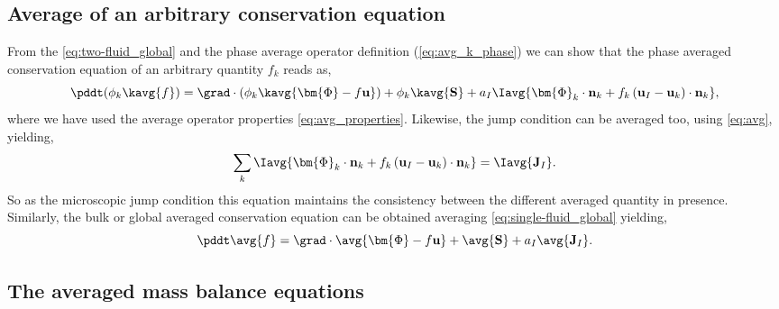 \subsection{Average of an arbitrary conservation equation}

From the \ref{eq:two-fluid_global} and the phase average operator definition (\ref{eq:avg_k_phase}) we can show that the phase averaged conservation equation of an arbitrary quantity $f_k$ reads as, 
\begin{equation}
    \pddt (\phi_k\kavg{f})
    = \grad \cdot \left(
        \phi_k \kavg{\bm{\Phi} - f \textbf{u}}
    \right)
    + \phi_k \kavg{\textbf{S}}
    + a_I \Iavg{
        \bm{\Phi}_k \cdot \textbf{n}_k
        + f_k 
        \left(
            \textbf{u}_I
            - \textbf{u}_k
        \right) \cdot \textbf{n}_k
    },
    \label{eq:avg_k_global}
\end{equation}
where we have used the average operator properties \ref{eq:avg_properties}.
Likewise, the jump condition can be averaged too, using \ref{eq:avg}, yielding,
\begin{equation}
    \sum_k 
    \Iavg{
        \bm{\Phi}_k 
        \cdot \textbf{n}_k
        + f_k 
        \left(
            \textbf{u}_I
            - \textbf{u}_k
        \right) 
        \cdot \textbf{n}_k
    }
    = \Iavg{\textbf{J}_I}.
    \label{eq:avg_general_jump}
\end{equation}
So as the microscopic jump condition this equation maintains the consistency between the different averaged quantity in presence. 
Similarly, the bulk or global averaged conservation equation can be obtained averaging \ref{eq:single-fluid_global} yielding,
\begin{equation*}
    \pddt \avg{f}
    = \grad \cdot \avg{\bm{\Phi} - f \textbf{u}}
    + \avg{\textbf{S}}
    + a_I\avg{\textbf{J}_I}.
    \label{eq:avg_global}
\end{equation*}


\subsection{The averaged mass balance equations}

